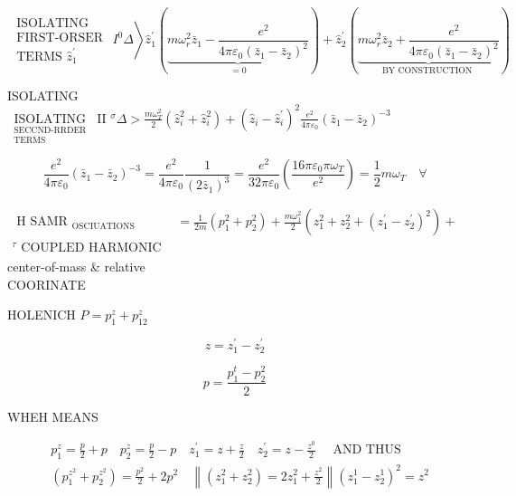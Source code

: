 $$
\left.\begin{array}{c}
\text { ISOLATING } \\
\text { FIRST-ORSER } \\
\text { TERMS } \hat{z}_{1}^{\prime}
\end{array} I^{0} \Delta\right\rangle \hat{z}_{1}^{\prime}(\underbrace{m \omega_{r}^{2} \bar{z}_{1}-\frac{e^{2}}{4 \pi \varepsilon_{0}\left(\bar{z}_{1}-\bar{z}_{2}\right)^{2}}}_{=0})+\hat{z}_{2}^{\prime}(\underbrace{m \omega_{r}^{2} \bar{z}_{2}+\frac{e^{2}}{4 \pi \varepsilon_{0}\left(\bar{z}_{1}-\bar{z}_{2}\right)^{2}}}_{\text {BY CONSTRUCTION }})
$$

ISOLATING\\
$\underset{\substack{\text { SECCND-RRDER } \\ \text { TERMS }}}{\text { ISOLATING }}$ II $^{\sigma} \Delta>\frac{m \omega_{T}^{2}}{2}\left(\hat{z}_{i}^{2}+\hat{z}_{i}^{2}\right)+\left(\hat{z}_{i}-\hat{z}_{i}^{\prime}\right)^{2} \frac{e^{2}}{4 \pi \varepsilon_{0}}\left(\bar{z}_{1}-\bar{z}_{2}\right)^{-3}$

$$
\frac{e^{2}}{4 \pi \varepsilon_{0}}\left(\bar{z}_{1}-\bar{z}_{2}\right)^{-3}=\frac{e^{2}}{4 \pi \varepsilon_{0}} \frac{1}{\left(2 \bar{z}_{1}\right)^{3}}=\frac{e^{2}}{32 \pi \varepsilon_{0}}\left(\frac{16 \pi \varepsilon_{0} \pi \omega_{T}}{e^{2}}\right)=\frac{1}{2} m \omega_{T} \quad \forall
$$

$\begin{aligned} \text { H SAMR }_{\text {OSCIUATIONS }} & =\frac{1}{2 m}\left(p_{1}^{2}+p_{2}^{2}\right)+\frac{m \omega_{1}^{2}}{2}\left(z_{1}^{2}+z_{2}^{2}+\left(z_{1}^{\prime}-z_{2}^{\prime}\right)^{2}\right)+ \\ { }^{\tau} \text { COUPLED HARMONIC OSCILATORS (YEAM, NO BIG SURARISE) } & \end{aligned}$\\
center-of-mass \& relative\\
COORINATE

HOLENICH $P=p_{1}^{z}+p_{12}^{z}$

$$
z=z_{1}^{\prime}-z_{2}^{\prime}
$$

$$
p=\frac{p_{1}^{t}-p_{2}^{2}}{2}
$$

WHEH MEANS

$$
\begin{aligned}
& p_{1}^{z}=\frac{p}{2}+p \quad p_{2}^{z}=\frac{p}{2}-p \quad z_{1}^{\prime}=z+\frac{z}{2} \quad z_{2}^{\prime}=z-\frac{z^{0}}{2} \quad \text { AND THUS } \\
& \left(p_{1}^{z^{2}}+p_{2}^{z^{2}}\right)=\frac{p^{2}}{2}+2 p^{2} \quad\left\|\left(z_{1}^{2}+z_{2}^{2}\right)=2 z_{1}^{2}+\frac{z^{2}}{2}\right\|\left(z_{1}^{1}-z_{2}^{1}\right)^{2}=z^{2}
\end{aligned}
$$

